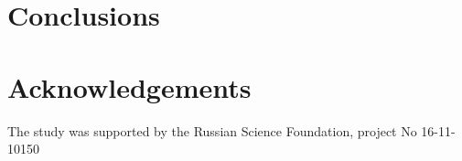 \documentclass{svproc}
\begin{document}
\section{Conclusions}

\section*{Acknowledgements}
The study was supported by the Russian Science Foundation, project No 16-11-
10150

%

{}
\end{document}
